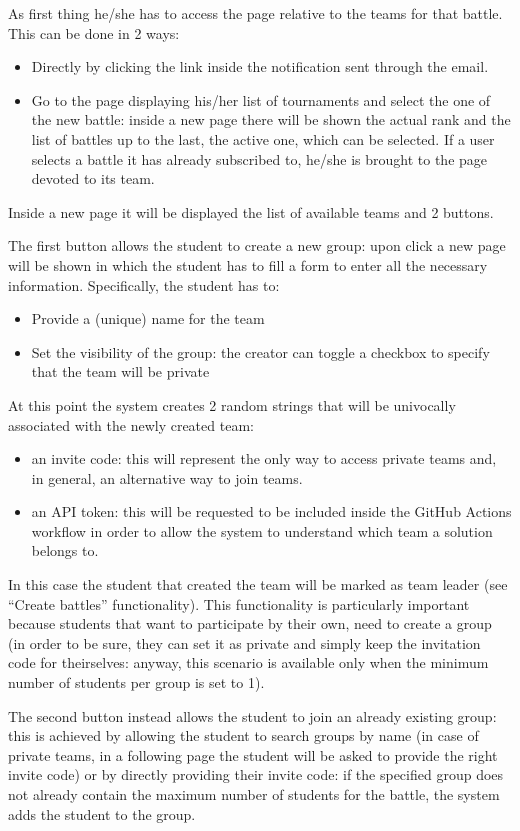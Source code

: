 As first thing he/she has to access the page relative to the teams for that battle. This can be done in 2 ways:
\begin{itemize}
    \item Directly by clicking the link inside the notification sent through the email.
    \item Go to the page displaying his/her list of tournaments and select the one of the new battle: inside a new page there will be shown the actual rank and the list of battles up to the last,  the active one, which can be selected. If a user selects a battle it has already subscribed to, he/she is brought to the page devoted to its team.
\end{itemize}
Inside a new page it will be displayed the list of available teams and 2 buttons.

The first button allows the student to create a new group: upon click a new page will be shown in which the student has to fill a form to enter all the necessary information. Specifically, the student has to:
\begin{itemize}
    \item Provide a (unique) name for the team
    \item Set the visibility of the group: the creator can toggle a checkbox to specify that the team will be private
\end{itemize}
At this point the system creates 2 random strings that will be univocally associated with the newly created team:
\begin{itemize}
    \item an invite code: this will represent the only way to access private teams and, in general, an alternative way to join teams.
    \item an API token: this will be requested to be included inside the GitHub Actions workflow in order to allow the system to understand which team a solution belongs to.
\end{itemize}  
In this case the student that created the team will be marked as team leader (see “Create battles” functionality). This functionality is particularly important because students that want to participate by their own, need to create a group (in order to be sure, they can set it as private and simply keep the invitation code for theirselves: anyway, this scenario is available only when the minimum number of students per group is set to 1).

The second button instead allows the student to join an already existing group: this is achieved by allowing the student to search groups by name (in case of private teams, in a following page the student will be asked to provide the right invite code) or by directly providing their invite code: if the specified group does not already contain the maximum number of students for the battle, the system adds the student to the group.
